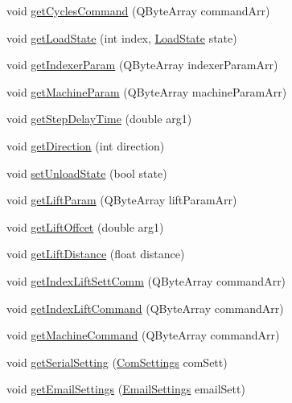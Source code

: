 \begin{DoxyCompactItemize}
\item 
void \mbox{\hyperlink{classMainWindow_a7f0e94461843c006389d792048c6b2d1}{get\+Cycles\+Command}} (Q\+Byte\+Array command\+Arr)
\item 
void \mbox{\hyperlink{classMainWindow_a7c2d999fc817728b31dccaaa1e72bd43}{get\+Load\+State}} (int index, \mbox{\hyperlink{headform_8h_a56d194976643934b3332b3f99d82490d}{Load\+State}} state)
\item 
void \mbox{\hyperlink{classMainWindow_a5c6f8757a262535d243b6f481ceb570b}{get\+Indexer\+Param}} (Q\+Byte\+Array indexer\+Param\+Arr)
\item 
void \mbox{\hyperlink{classMainWindow_a2dc63192aa7ff54dfc64e8308712c287}{get\+Machine\+Param}} (Q\+Byte\+Array machine\+Param\+Arr)
\item 
void \mbox{\hyperlink{classMainWindow_a1da3e0b195babf250e071baca42b16b3}{get\+Step\+Delay\+Time}} (double arg1)
\item 
void \mbox{\hyperlink{classMainWindow_a98097440e933cbc9a5080320e230c124}{get\+Direction}} (int direction)
\item 
void \mbox{\hyperlink{classMainWindow_aeee3b80eb69746981c80032d8992ed46}{set\+Unload\+State}} (bool state)
\item 
void \mbox{\hyperlink{classMainWindow_a65683f9a3748cd4f783daf2f57b4f318}{get\+Lift\+Param}} (Q\+Byte\+Array lift\+Param\+Arr)
\item 
void \mbox{\hyperlink{classMainWindow_a9da44a03d4e720dba6a3d63f7aa22ea5}{get\+Lift\+Offcet}} (double arg1)
\item 
void \mbox{\hyperlink{classMainWindow_a11a73a8f479b8952951f29df988ff2c3}{get\+Lift\+Distance}} (float distance)
\item 
void \mbox{\hyperlink{classMainWindow_a4f4ada31d5edeadf6450a1cf952182c0}{get\+Index\+Lift\+Sett\+Comm}} (Q\+Byte\+Array command\+Arr)
\item 
void \mbox{\hyperlink{classMainWindow_aefe64936a5d347902ba7d9438294dab8}{get\+Index\+Lift\+Command}} (Q\+Byte\+Array command\+Arr)
\item 
void \mbox{\hyperlink{classMainWindow_a3dfd3ec74dbf6a8bbef327aab4c88de4}{get\+Machine\+Command}} (Q\+Byte\+Array command\+Arr)
\item 
void \mbox{\hyperlink{classMainWindow_a477250c56749d4db7cf5d94ea30145cf}{get\+Serial\+Setting}} (\mbox{\hyperlink{structComSettings}{Com\+Settings}} com\+Sett)
\item 
void \mbox{\hyperlink{classMainWindow_a5782e86aacd3c157412821fae13c85fb}{get\+Email\+Settings}} (\mbox{\hyperlink{structEmailSettings}{Email\+Settings}} email\+Sett)

\end{DoxyCompactItemize}
